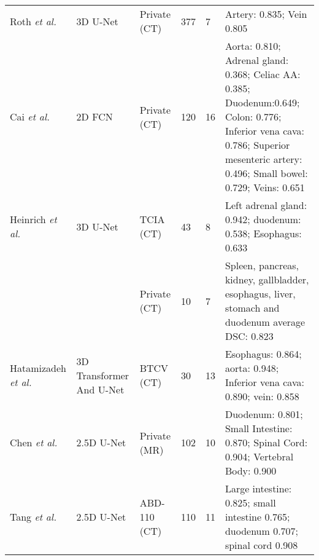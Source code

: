 \documentclass[lettersize,journal]{IEEEtran}
\begin{document}
{\begin{table*}[ht!]
{\begin{tabular}{@{}lllllm{}@{}}
Roth {\it{et al.}} \cite{61}        & 3D U-Net                 & Private (CT)                                 & 377                       & 7                           & Artery: 0.835; Vein 0.805                                                                                                                                                          \\
Cai {\it{et al.}} \cite{62}         & 2D FCN                   & Private (CT)                                 & 120                       & 16                          & Aorta: 0.810; Adrenal gland: 0.368; Celiac AA: 0.385; Duodenum:0.649; Colon: 0.776; Inferior vena cava: 0.786; Superior mesenteric artery: 0.496; Small bowel: 0.729; Veins: 0.651 \\
Heinrich {\it{et al.}} \cite{63}    & 3D U-Net                 & TCIA (CT) \cite{56,57}                 & 43                        & 8                           & Left adrenal gland: 0.942; duodenum: 0.538; Esophagus: 0.633                                                                                                                       \\
                            &                          & Private (CT)                                 & 10                        & 7                           & Spleen, pancreas, kidney, gallbladder, esophagus, liver, stomach and duodenum average DSC: 0.823                                                                                   \\
Hatamizadeh {\it{et al.}} \cite{66} & 3D Transformer And U-Net & BTCV (CT) \cite{29}                           & 30                        & 13                          & Esophagus: 0.864; aorta: 0.948; Inferior vena cava: 0.890; vein: 0.858                                                                                                             \\
Chen {\it{et al.}} \cite{67}        & 2.5D U-Net               & Private (MR)                                 & 102                       & 10                          & Duodenum: 0.801; Small Intestine: 0.870; Spinal Cord: 0.904; Vertebral Body: 0.900                                                                                                 \\
Tang {\it{et al.}} \cite{68}        & 2.5D U-Net               & ABD-110 (CT) \cite{68}                        & 110                       & 11                          & Large intestine: 0.825; small intestine 0.765; duodenum 0.707; spinal cord 0.908                                                                                                   \\

\end{tabular}}
\end{table*}}
\end{document}
